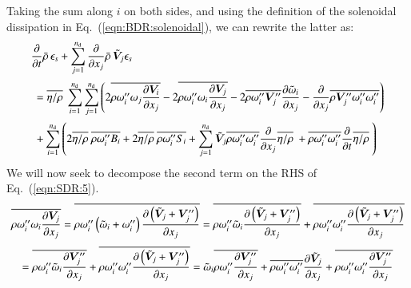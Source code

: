 \documentclass{warpdoc}
\newcommand{\alb}{\vspace{0.2cm}\\} %
\newcommand{\nd}{{{n}_{\rm d}}}
\newcommand{\mfd}{\displaystyle}
\begin{document}
%
Taking the sum along $i$ on both sides, and using the definition of the
solenoidal dissipation in Eq.\ (\ref{eqn:BDR:solenoidal}),
we can rewrite the latter as:
%
%
\begin{equation}
 \begin{array}{l}
         \mfd \frac{\partial }{\partial t} \wbar{\rho}\, \epsilon_s
        +\mfd\sum_{j=1}^{\nd}
           \frac{\partial }{\partial x_j} \wbar{\rho}\, {\wtilde{\bm{V}}_j} \epsilon_s
     \alb~~=
   \overline{\eta/\rho}~ \mfd\sum_{i=1}^{\nd} \mfd\sum_{j=1}^{\nd}
    \mfd\left(
         2 \overline{\rho  \omega_i^{\prime\prime}  \omega_j  \frac{\partial \bm{V}_i}{\partial x_j}}
       - 2 \overline{\rho  \omega_i^{\prime\prime}  \omega_i  \frac{\partial \bm{V}_j}{\partial x_j}}
       - 2 \overline{\rho \omega_i^{\prime\prime} \bm{V}_j^{\prime\prime}}  \frac{\partial {\wtilde{\omega}_i}}{\partial x_j}
       - \frac{\partial }{\partial x_j} \overline{\rho {\bm{V}_j^{\prime\prime}} \omega_i^{\prime\prime} \omega_i^{\prime\prime}}
    \right) \alb
 ~~+ \mfd\sum_{i=1}^{\nd} 
    \mfd\left(
         \mfd 2 \overline{\eta/\rho}~ \overline{\rho \omega_i^{\prime\prime} B_i}
       + 2 \overline{\eta/\rho}~ \overline{\rho \omega_i^{\prime\prime} S_i}
       + \sum_{j=1}^\nd{\wtilde{\bm{V}}_j} \overline{\rho \omega_i^{\prime\prime} \omega_i^{\prime\prime}} \frac{\partial }{\partial x_j}  \overline{\eta/\rho}~
       + \overline{\rho \omega_i^{\prime\prime} \omega_i^{\prime\prime}} \frac{\partial }{\partial t} \overline{\eta/\rho}~
    \right) 
 \end{array}
\label{eqn:SDR:5}
\end{equation}
%
We will now seek to decompose the second term on the RHS of Eq.\ (\ref{eqn:SDR:5}).
%
\begin{displaymath}
  \overline{\rho  \omega_i^{\prime\prime}  \omega_i  \frac{\partial \bm{V}_j}{\partial x_j}}
   = \overline{\rho  \omega_i^{\prime\prime}  \left({\tilde{\omega}_i}+\omega_i^{\prime\prime} \right) \frac{\partial \left({\tilde{\bm{V}}_j}+\bm{V}_j^{\prime\prime}\right)}{\partial x_j}}
   = \overline{\rho  \omega_i^{\prime\prime}  {\tilde{\omega}_i} \frac{\partial \left({\tilde{\bm{V}}_j}+\bm{V}_j^{\prime\prime}\right)}{\partial x_j}}
       + \overline{\rho  \omega_i^{\prime\prime}  \omega_i^{\prime\prime} \frac{\partial \left({\tilde{\bm{V}}_j}+\bm{V}_j^{\prime\prime}\right)}{\partial x_j}}
\end{displaymath}
%
\begin{displaymath}
   = \overline{\rho  \omega_i^{\prime\prime}  {\tilde{\omega}_i} \frac{\partial \bm{V}_j^{\prime\prime}}{\partial x_j}}
       + \overline{\rho  \omega_i^{\prime\prime}  \omega_i^{\prime\prime} \frac{\partial \left({\tilde{\bm{V}}_j}+\bm{V}_j^{\prime\prime}\right)}{\partial x_j}}
   = {\tilde{\omega}_i} \overline{\rho  \omega_i^{\prime\prime}  \frac{\partial \bm{V}_j^{\prime\prime}}{\partial x_j}}
       + \overline{\rho  \omega_i^{\prime\prime}  \omega_i^{\prime\prime}} \frac{\partial {\tilde{\bm{V}}_j}}{\partial x_j}
       + \overline{\rho  \omega_i^{\prime\prime}  \omega_i^{\prime\prime} \frac{\partial \bm{V}_j^{\prime\prime}}{\partial x_j}}
\end{displaymath}
\end{document}
